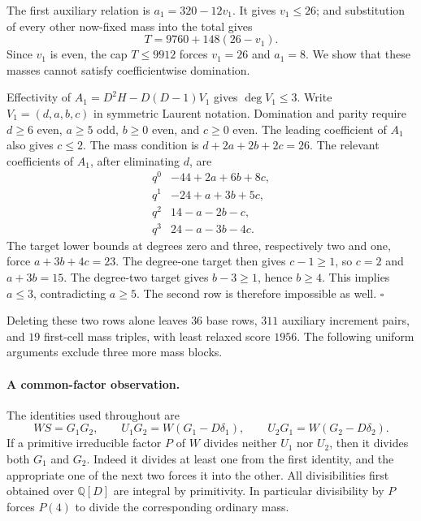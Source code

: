 The first auxiliary relation is $a_1=320-12v_1$.
It gives $v_1\le26$; and substitution of every other
now-fixed mass into the total gives
\[
                    T=9760+148(26-v_1).
\]
Since $v_1$ is even, the cap $T\le9912$ forces
$v_1=26$ and $a_1=8$.
We show that these masses cannot satisfy coefficientwise
domination.

Effectivity of $A_1=D^2H-D(D-1)V_1$ gives
$\deg V_1\le3$. Write $V_1=(d,a,b,c)$ in symmetric
Laurent notation. Domination and parity require
$d\ge6$ even, $a\ge5$ odd, $b\ge0$ even, and
$c\ge0$ even. The leading coefficient of $A_1$
also gives $c\le2$.
The mass condition is $d+2a+2b+2c=26$.
The relevant coefficients of $A_1$, after eliminating
$d$, are
\[
 \begin{array}{c|l}
 q^0&-44+2a+6b+8c,\\
 q^1&-24+a+3b+5c,\\
 q^2&14-a-2b-c,\\
 q^3&24-a-3b-4c.
 \end{array}
\]
The target lower bounds at degrees zero and three,
respectively two and one, force
$a+3b+4c=23$. The degree-one target then gives
$c-1\ge1$, so $c=2$ and $a+3b=15$.
The degree-two target gives $b-3\ge1$, hence $b\ge4$.
This implies $a\le3$, contradicting $a\ge5$.
The second row is therefore impossible as well.
\hfill$\square$

Deleting these two rows alone leaves $36$ base rows,
$311$ auxiliary increment pairs, and $19$ first-cell
mass triples, with least relaxed score $1956$.
The following uniform arguments exclude three more
mass blocks.

\paragraph{A common-factor observation.}
The identities used throughout are
\[
 WS=G_1G_2,\qquad U_1G_2=W(G_1-D\delta_1),\qquad
 U_2G_1=W(G_2-D\delta_2).                            \tag{G036.R2}
\]
If a primitive irreducible factor $P$ of $W$ divides
neither $U_1$ nor $U_2$, then it divides both $G_1$
and $G_2$. Indeed it divides at least one from the
first identity, and the appropriate one of the next
two forces it into the other. All divisibilities
first obtained over $\mathbb Q[D]$ are integral by
primitivity. In particular divisibility by $P$ forces
$P(4)$ to divide the corresponding ordinary mass.

